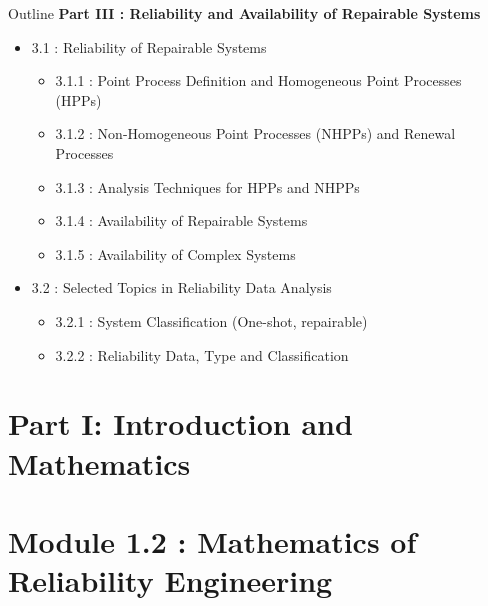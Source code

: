\documentclass{beamer}
\begin{document}
\begin{frame}{Outline}
\small
\textbf{Part III : Reliability and Availability of Repairable Systems}
\begin{itemize}
\item 3.1 : Reliability of Repairable Systems
\begin{itemize}
\item 3.1.1 : Point Process Definition and Homogeneous Point Processes (HPPs)
\item 3.1.2 : Non-Homogeneous Point Processes (NHPPs) and Renewal Processes
\item 3.1.3 : Analysis Techniques for HPPs and NHPPs
\item 3.1.4 : Availability of Repairable Systems
\item 3.1.5 : Availability of Complex Systems
\end{itemize}
\item 3.2 : Selected Topics in Reliability Data Analysis
\begin{itemize}
\item 3.2.1 : System Classification (One-shot, repairable)
\item 3.2.2 : Reliability Data, Type and Classification
\end{itemize}
\end{itemize}
\end{frame}

\section{Part I: Introduction and Mathematics}

\section{Module 1.2 : Mathematics of Reliability Engineering}
\end{document}
